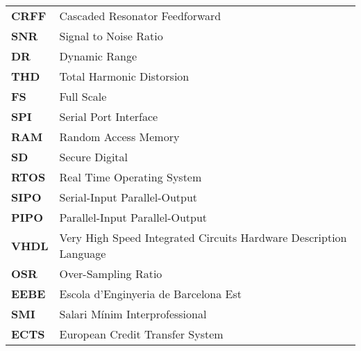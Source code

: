 \begin{longtable}[H]{ll}
\\
\textbf{CRFF} & Cascaded Resonator Feedforward
\\
\textbf{SNR} & Signal to Noise Ratio
\\
\textbf{DR} & Dynamic Range
\\
\textbf{THD} & Total Harmonic Distorsion
\\
\textbf{FS} & Full Scale
\\
\textbf{SPI} & Serial Port Interface
\\
\textbf{RAM} & Random Access Memory
\\
\textbf{SD} & Secure Digital
\\
\textbf{RTOS} & Real Time Operating System
\\
\textbf{SIPO} & Serial-Input Parallel-Output
\\
\textbf{PIPO} & Parallel-Input Parallel-Output
\\
\textbf{VHDL} & Very High Speed Integrated Circuits Hardware Description Language
\\
\textbf{OSR} & Over-Sampling Ratio
\\
\textbf{EEBE} & Escola d'Enginyeria de Barcelona Est
\\
\textbf{SMI} & Salari Mínim Interprofessional
\\
\textbf{ECTS} & European Credit Transfer System
\end{longtable}